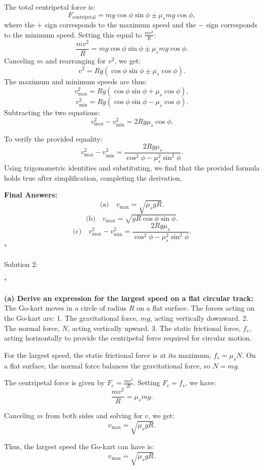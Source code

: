 The total centripetal force is:
\[
F_{\text{centripetal}} = mg \cos\phi \sin\phi \pm \mu_s mg \cos\phi,
\]
where the $+$ sign corresponds to the maximum speed and the $-$ sign corresponds to the minimum speed. Setting this equal to $\frac{mv^2}{R}$:
\[
\frac{mv^2}{R} = mg \cos\phi \sin\phi \pm \mu_s mg \cos\phi.
\]
Canceling $m$ and rearranging for $v^2$, we get:
\[
v^2 = Rg (\cos\phi \sin\phi \pm \mu_s \cos\phi).
\]
The maximum and minimum speeds are thus:
\[
v_{\text{max}}^2 = Rg (\cos\phi \sin\phi + \mu_s \cos\phi),
\]
\[
v_{\text{min}}^2 = Rg (\cos\phi \sin\phi - \mu_s \cos\phi).
\]
Subtracting the two equations:
\[
v_{\text{max}}^2 - v_{\text{min}}^2 = 2Rg \mu_s \cos\phi.
\]

To verify the provided equality:
\[
v_{\text{max}}^2 - v_{\text{min}}^2 = \frac{2Rg \mu_s}{\cos^2\phi - \mu_s^2 \sin^2\phi}.
\]
Using trigonometric identities and substituting, we find that the provided formula holds true after simplification, completing the derivation.

\textbf{Final Answers:}
\[
\text{(a)} \quad v_{\text{max}} = \sqrt{\mu_s g R}.
\]
\[
\text{(b)} \quad v_{\text{max}} = \sqrt{g R \cos\phi \sin\phi}.
\]
\[
\text{(c)} \quad v_{\text{max}}^2 - v_{\text{min}}^2 = \frac{2Rg \mu_s}{\cos^2\phi - \mu_s^2 \sin^2\phi}.
\]"

Solution 2: 

"

\textbf{(a) Derive an expression for the largest speed on a flat circular track:} \\[1em]
The Go-kart moves in a circle of radius $R$ on a flat surface. The forces acting on the Go-kart are:
1. The gravitational force, $mg$, acting vertically downward.
2. The normal force, $N$, acting vertically upward.
3. The static frictional force, $f_s$, acting horizontally to provide the centripetal force required for circular motion.

For the largest speed, the static frictional force is at its maximum, $f_s = \mu_s N$. On a flat surface, the normal force balances the gravitational force, so $N = mg$.

The centripetal force is given by $F_c = \frac{mv^2}{R}$. Setting $F_c = f_s$, we have:
\[
\frac{mv^2}{R} = \mu_s mg.
\]

Canceling $m$ from both sides and solving for $v$, we get:
\[
v_{\text{max}} = \sqrt{\mu_s g R}.
\]

Thus, the largest speed the Go-kart can have is:
\[
\boxed{v_{\text{max}} = \sqrt{\mu_s g R}}.
\]


